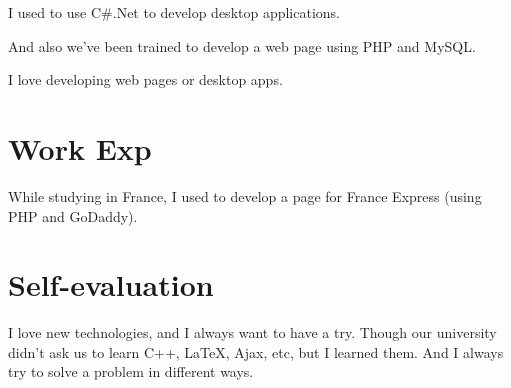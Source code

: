 \documentclass[UTF8]{ctexart}
\begin{document}
I used to use C\#{}.Net to develop desktop applications.

And also we've been trained to develop a web page using PHP and MySQL.

I love developing web pages or desktop apps.
\section{Work Exp}
While studying in France, I used to develop a page for France Express (using PHP and GoDaddy).
\section{Self-evaluation}
I love new technologies, and I always want to have a try. Though our university didn't ask us to learn C++, \LaTeX{}, Ajax, etc, but I learned them. And I always try to solve a problem in different ways.
\end{document}
